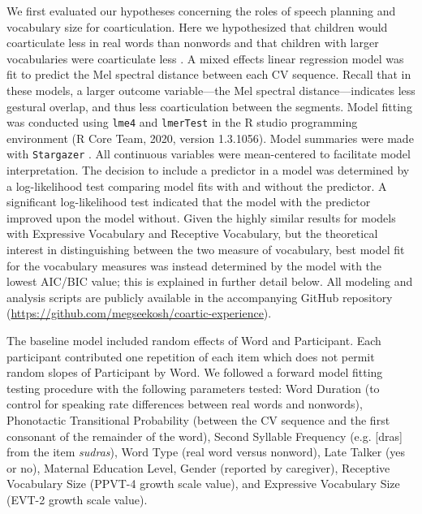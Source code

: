 \documentclass[a4paper,man,natbib,donotrepeattitle, apacite]{apa6}
\begin{document}
We first evaluated our hypotheses concerning the roles of speech planning and vocabulary size for coarticulation. Here we hypothesized that children would coarticulate less in  real words than nonwords and that children with larger vocabularies were coarticulate less \cite{noiraySpokenLanguageDevelopment2019}. A mixed effects linear regression model was fit to predict the Mel spectral distance between each CV sequence. Recall that in these models, a larger outcome variable---the Mel spectral distance---indicates less gestural overlap, and thus less coarticulation between the segments. Model fitting was conducted using \texttt{lme4} \cite{batesFittingLinearMixedeffects2015} and \texttt{lmerTest} \cite{kuznetsovaLmerTestPackageTests2017} in the R studio programming environment (R Core Team, 2020, version 1.3.1056). Model summaries were made with \texttt{Stargazer} \cite{hlavacStargazerWellFormattedRegression2018}. All continuous variables were mean-centered to facilitate model interpretation. The decision to include a predictor in a model was determined by a log-likelihood test comparing model fits with and without the predictor. A significant log-likelihood test indicated that the model  with the predictor improved upon the model without. Given the highly similar results for models with Expressive Vocabulary and Receptive Vocabulary, but the theoretical interest in distinguishing between the two measure of vocabulary, best model fit for the vocabulary measures was instead determined by the model with the lowest AIC/BIC value; this is explained in further detail below. All modeling and analysis scripts are publicly available in the accompanying GitHub repository (\url{https://github.com/megseekosh/coartic-experience}). 

The baseline model included random effects of Word and Participant. Each participant contributed one repetition of each item which does not permit random slopes of Participant by Word. We followed a forward model fitting testing procedure with the following parameters tested: Word Duration (to control for speaking rate differences between real words and nonwords), Phonotactic Transitional Probability (between the CV sequence and the first consonant of the remainder of the word), Second Syllable Frequency (e.g. [dras] from the item \textit{sudras}), Word Type (real word versus nonword), Late Talker (yes or no), Maternal Education Level, Gender (reported by caregiver), Receptive Vocabulary Size (PPVT-4 growth scale value), and Expressive Vocabulary Size (EVT-2 growth scale value). 
\end{document}

